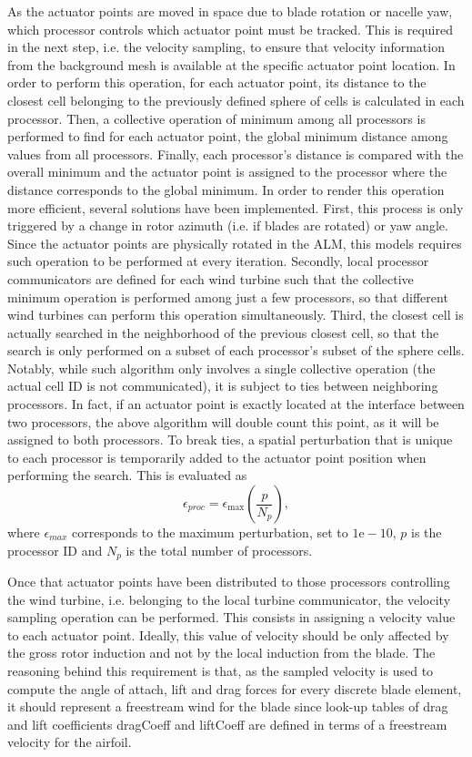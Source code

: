 As the actuator points are moved in space due to blade rotation or nacelle yaw, which processor controls which actuator point must be tracked. This is required in the next step, i.e. the velocity sampling, to ensure that velocity information from the background mesh is available at the specific actuator point location. In order to perform this operation, for each actuator point, its distance to the closest cell belonging to the previously defined sphere of cells is calculated in each processor. Then, a collective operation of minimum among all processors is performed to find for each actuator point, the global minimum distance among values from all processors. Finally, each processor's distance is compared with the overall minimum and the actuator point is assigned to the processor where the distance corresponds to the global minimum. In order to render this operation more efficient, several solutions have been implemented. First, this process is only triggered by a change in rotor azimuth (i.e. if blades are rotated) or yaw angle. Since the actuator points are physically rotated in the ALM, this models requires such operation to be performed at every iteration. Secondly, local processor communicators are defined for each wind turbine such that the collective minimum operation is performed among just a few processors, so that different wind turbines can perform this operation simultaneously. Third, the closest cell is actually searched in the neighborhood of the previous closest cell, so that the search is only performed on a subset of each processor's subset of the sphere cells. Notably, while such algorithm only involves a single collective operation (the actual cell ID is not communicated), it is subject to ties between neighboring processors. In fact, if an actuator point is exactly located at the interface between two processors, the above algorithm will double count this point, as it will be assigned to both processors. To break ties, a spatial perturbation that is unique to each processor is temporarily added to the actuator point position when performing the search. This is evaluated as
\begin{equation}
	\epsilon_\textit{proc} = \epsilon_\text{max}\left(\frac{p}{N_p}\right), \label{eq:procPerturbation}
\end{equation}
where $\epsilon_\textit{max}$ corresponds to the maximum perturbation, set to $1\text{e}-10$, $p$ is the processor ID and $N_p$ is the total number of processors.

Once that actuator points have been distributed to those processors controlling the wind turbine, i.e. belonging to the local turbine communicator, the velocity sampling operation can be performed. This consists in assigning a velocity value to each actuator point. Ideally, this value of velocity should be only affected by the gross rotor induction and not by the local induction from the blade. The reasoning behind this requirement is that, as the sampled velocity is used to compute the angle of attach, lift and drag forces for every discrete blade element, it should represent a freestream wind for the blade since look-up tables of drag and lift coefficients \gls{dragCoeff} and \gls{liftCoeff} are defined in terms of a freestream velocity for the airfoil.

